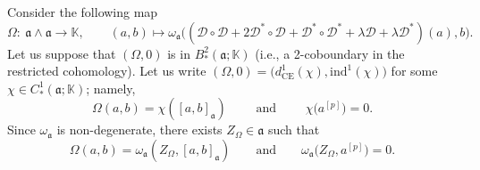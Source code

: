 \documentclass[pdftex]{sigma}
\numberwithin{equation}{section}
\begin{document}
Consider the following map
\[
\Omega\colon\ \mathfrak{a}\wedge \mathfrak{a} \rightarrow \mathbb{K}, \qquad (a,b) \mapsto \omega_\mathfrak{a} \bigl( ({\mathscr D} \circ {\mathscr D}+ 2 {\mathscr D}^* \circ {\mathscr D}+ {\mathscr D}^* \circ {\mathscr D}^* +\lambda {\mathscr D} + \lambda {\mathscr D} ^* )(a) , b \bigr).
\]
Let us suppose that $(\Omega, 0)$ is in $B^2_*(\mathfrak{a};\mathbb{K})$ (i.e., a 2-coboundary in the restricted cohomology). Let us write $(\Omega, 0)= \bigl(d^1_{\mathrm{CE}} (\chi), \mathrm{ind}^1(\chi) \bigr)$ for some $\chi\in C^1_*(\mathfrak{a}; \mathbb{K})$; namely,
\[
\Omega(a,b)=\chi([a,b]_\mathfrak{a}) \qquad \text{ and } \qquad \chi\bigl(a^{[p]}\bigr)=0.
\]
Since $\omega_\mathfrak{a}$ is non-degenerate, there exists $Z_\Omega\in \mathfrak{a}$ such that
\begin{equation*}%
\Omega(a,b)=\omega_\mathfrak{a}(Z_\Omega,[a,b]_\mathfrak{a})\qquad \text{and} \qquad \omega_\mathfrak{a}\bigl(Z_\Omega,a^{[p]}\bigr)=0.
\end{equation*}
\end{document}
